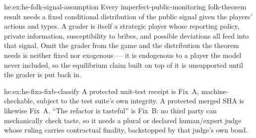 \begin{pdSolution}{he:ex:he-folk-signal-assumption}
Every imperfect-public-monitoring folk-theorem result needs a fixed
conditional distribution of the public signal given the players' actions and
types. A grader is itself a strategic player whose reporting policy, private
information, susceptibility to bribes, and possible deviations all feed into
that signal. Omit the grader from the game and the distribution the theorem
needs is neither fixed nor exogenous --- it is endogenous to a player the model
never included, so the equilibrium claim built on top of it is unsupported until
the grader is put back in.
\end{pdSolution}
\begin{pdSolution}{he:ex:he-fixa-fixb-classify}
A protected unit-test receipt is Fix~A, machine-checkable, subject to the
test suite's own integrity. A protected merged SHA is likewise Fix~A. ``The
refactor is tasteful'' is Fix~B: no third party can mechanically check taste, so
it needs a plural or declared human/expert judge whose ruling carries
contractual finality, backstopped by that judge's own bond.
\end{pdSolution}
